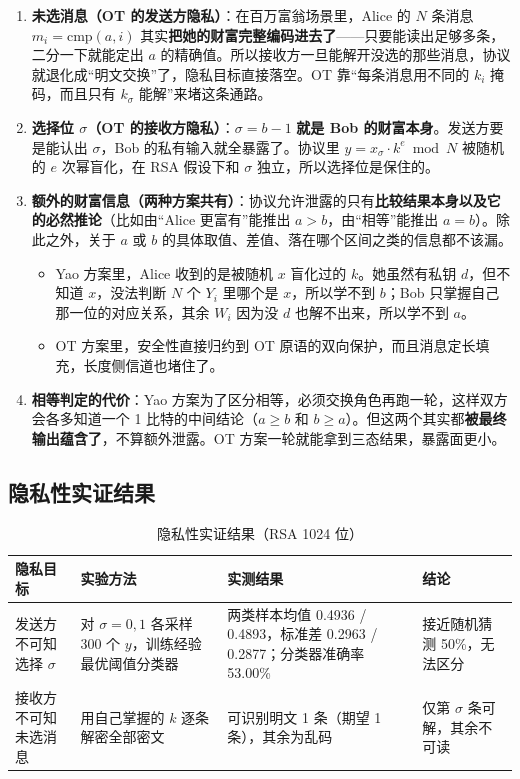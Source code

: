 \documentclass{SYSUReport}
\begin{document}
\begin{enumerate}
    \item \textbf{未选消息（OT 的发送方隐私）}：在百万富翁场景里，Alice 的 $N$ 条消息 $m_i=\text{cmp}(a,i)$ 其实\textbf{把她的财富完整编码进去了}——只要能读出足够多条，二分一下就能定出 $a$ 的精确值。所以接收方一旦能解开没选的那些消息，协议就退化成“明文交换”了，隐私目标直接落空。OT 靠“每条消息用不同的 $k_i$ 掩码，而且只有 $k_\sigma$ 能解”来堵这条通路。
    \item \textbf{选择位 $\sigma$（OT 的接收方隐私）}：$\sigma=b-1$ \textbf{就是 Bob 的财富本身}。发送方要是能认出 $\sigma$，Bob 的私有输入就全暴露了。协议里 $y=x_\sigma\cdot k^{e}\bmod N$ 被随机的 $e$ 次幂盲化，在 RSA 假设下和 $\sigma$ 独立，所以选择位是保住的。
    \item \textbf{额外的财富信息（两种方案共有）}：协议允许泄露的只有\textbf{比较结果本身以及它的必然推论}（比如由“Alice 更富有”能推出 $a>b$，由“相等”能推出 $a=b$）。除此之外，关于 $a$ 或 $b$ 的具体取值、差值、落在哪个区间之类的信息都不该漏。
          \begin{itemize}
              \item Yao 方案里，Alice 收到的是被随机 $x$ 盲化过的 $k$。她虽然有私钥 $d$，但不知道 $x$，没法判断 $N$ 个 $Y_i$ 里哪个是 $x$，所以学不到 $b$；Bob 只掌握自己那一位的对应关系，其余 $W_i$ 因为没 $d$ 也解不出来，所以学不到 $a$。
              \item OT 方案里，安全性直接归约到 OT 原语的双向保护，而且消息定长填充，长度侧信道也堵住了。
          \end{itemize}
    \item \textbf{相等判定的代价}：Yao 方案为了区分相等，必须交换角色再跑一轮，这样双方会各多知道一个 1 比特的中间结论（$a\ge b$ 和 $b\ge a$）。但这两个其实都\textbf{被最终输出蕴含了}，不算额外泄露。OT 方案一轮就能拿到三态结果，暴露面更小。
\end{enumerate}

\subsection{隐私性实证结果}

\begin{table}[h]
\centering
\begin{tabular}{llll}
\toprule
隐私目标 & 实验方法 & 实测结果 & 结论 \\
\midrule
发送方不可知选择 $\sigma$ & 对 $\sigma=0,1$ 各采样 300 个 $y$，训练经验最优阈值分类器 & 两类样本均值 0.4936 / 0.4893，标准差 0.2963 / 0.2877；分类器准确率 53.00\% & 接近随机猜测 50\%，无法区分 \\
接收方不可知未选消息 & 用自己掌握的 $k$ 逐条解密全部密文 & 可识别明文 1 条（期望 1 条），其余为乱码 & 仅第 $\sigma$ 条可解，其余不可读 \\
\bottomrule
\end{tabular}
\caption{隐私性实证结果（RSA 1024 位）}
\label{tab:priv}
\end{table}
\end{document}
